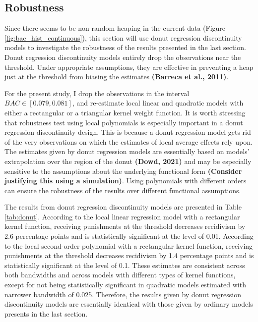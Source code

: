 \documentclass[
  11pt,
]{article}
\begin{document}
\hypertarget{robustness}{%
\subsection{Robustness}\label{robustness}}

Since there seems to be non-random heaping in the current data (Figure
\ref{fig:bac_hist_continuous}), this section will use donut regression
discontinuity models to investigate the robustness of the results
presented in the last section. Donut regression discontinuity models
entirely drop the observations near the threshold. Under appropriate
assumptions, they are effective in preventing a heap just at the
threshold from biasing the estimates \textbf{(Barreca et al., 2011)}.

For the present study, I drop the observations in the interval
\(BAC \in [0.079, 0.081]\), and re-estimate local linear and quadratic
models with either a rectangular or a triangular kernel weight function.
It is worth stressing that robustness test using local polynomials is
especially important in a donut regression discontinuity design. This is
because a donut regression model gets rid of the very observations on
which the estimates of local average effects rely upon. The estimates
given by donut regression models are essentially based on models'
extrapolation over the region of the donut \textbf{(Dowd, 2021)} and may
be especially sensitive to the assumptions about the underlying
functional form \textbf{(Consider justifying this using a simulation)}.
Using polynomials with different orders can ensure the robustness of the
results over different functional assumptions.

The results from donut regression discontinuity models are presented in
Table \ref{tab:donut}. According to the local linear regression model
with a rectangular kernel function, receiving punishments at the
threshold decreases recidivism by 2.6 percentage points and is
statistically significant at the level of 0.01. According to the local
second-order polynomial with a rectangular kernel function, receiving
punishments at the threshold decreases recidivism by 1.4 percentage
points and is statistically significant at the level of 0.1. These
estimates are consistent across both bandwidths and across models with
different types of kernel functions, except for not being statistically
significant in quadratic models estimated with narrower bandwidth of
0.025. Therefore, the results given by donut regression discontinuity
models are essentially identical with those given by ordinary models
presents in the last section.
\end{document}
